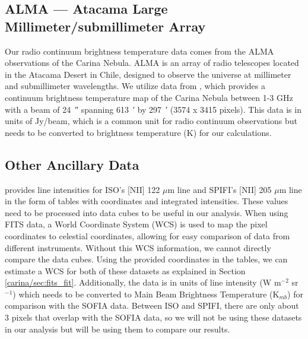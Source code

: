 \subsection{ALMA --- Atacama Large Millimeter/submillimeter Array}
Our radio continuum brightness temperature data comes from the ALMA observations of the Carina Nebula.
ALMA is an array of radio telescopes located in the Atacama Desert in Chile, designed to observe the universe at millimeter and submillimeter wavelengths.
We utilize data from \cite{Rebolledo_2021}, which provides a continuum brightness temperature map of the Carina Nebula between 1-3 GHz with a beam of \qty{24}{\arcsecond} spanning \qty{613}{\arcminute} by \qty{297}{\arcminute} (3574 x 3415 pixels).
This data is in units of Jy/beam, which is a common unit for radio continuum observations but needs to be converted to brightness temperature (K) for our calculations.

\subsection{Other Ancillary Data}
\cite{oberst2011205} provides line intensities for ISO's [NII] 122 $\mu$m line and SPIFI's [NII] 205 $\mu$m line in the form of tables with coordinates and integrated intensities.
These values need to be processed into data cubes to be useful in our analysis.
When using FITS data, a World Coordinate System (WCS) is used to map the pixel coordinates to celestial coordinates, allowing for easy comparison of data from different instruments.
Without this WCS information, we cannot directly compare the data cubes.
Using the provided coordinates in the tables, we can estimate a WCS for both of these datasets as explained in Section \ref{carina/sec:fits_fit}.
Additionally, the data is in units of line intensity (W m$^{-2}$ sr$^{-1}$) which needs to be converted to Main Beam Brightness Temperature (K$_{mb}$) for comparison with the SOFIA data.
Between ISO and SPIFI, there are only about 3 pixels that overlap with the SOFIA data, so we will not be using these datasets in our analysis but will be using them to compare our results.

